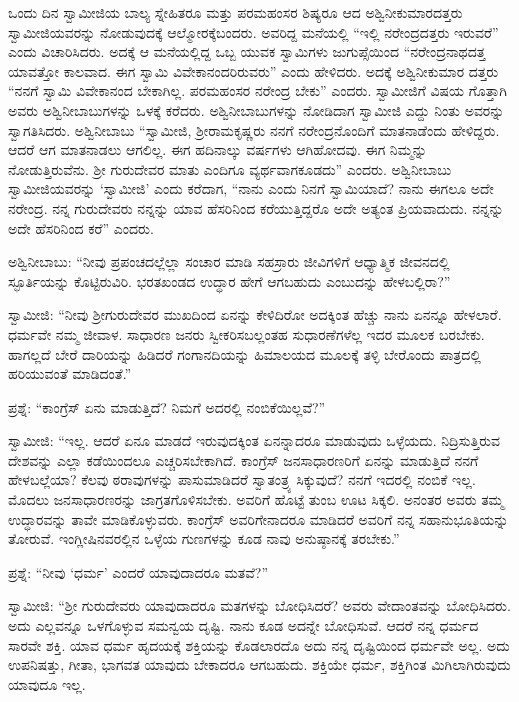  ಒಂದು ದಿನ ಸ್ವಾಮೀಜಿಯ ಬಾಲ್ಯ ಸ್ನೇಹಿತರೂ ಮತ್ತು ಪರಮಹಂಸರ ಶಿಷ್ಯರೂ ಆದ ಅಶ್ವಿನೀಕುಮಾರದತ್ತರು ಸ್ವಾಮೀಜಿಯವರನ್ನು ನೋಡುವುದಕ್ಕೆ ಆಲ್ಮೋರಕ್ಕೆ\break ಬಂದರು. ಅವರಿದ್ದ ಮನೆಯಲ್ಲಿ “ಇಲ್ಲಿ ನರೇಂದ್ರದತ್ತರು ಇರುವರೆ” ಎಂದು ವಿಚಾರಿಸಿದರು. ಅದಕ್ಕೆ ಆ ಮನೆಯಲ್ಲಿದ್ದ ಒಬ್ಬ ಯುವಕ ಸ್ವಾಮಿಗಳು ಜುಗುಪ್ಸೆಯಿಂದ “ನರೇಂದ್ರನಾಥದತ್ತ ಯಾವತ್ತೋ ಕಾಲವಾದ. ಈಗ ಸ್ವಾಮಿ ವಿವೇಕಾನಂದರಿರುವರು” ಎಂದು ಹೇಳಿದರು. ಅದಕ್ಕೆ ಅಶ್ವಿನೀಕುಮಾರ ದತ್ತರು “ನನಗೆ ಸ್ವಾಮಿ ವಿವೇಕಾನಂದ ಬೇಕಾಗಿಲ್ಲ. ಪರಮಹಂಸರ ನರೇಂದ್ರ ಬೇಕು” ಎಂದರು. ಸ್ವಾಮೀಜಿಗೆ ವಿಷಯ ಗೊತ್ತಾಗಿ ಅವರು ಅಶ್ವಿನೀಬಾಬುಗಳನ್ನು ಒಳಕ್ಕೆ ಕರೆದರು. ಅಶ್ವಿನೀಬಾಬುಗಳನ್ನು ನೋಡಿದಾಗ ಸ್ವಾಮೀಜಿ ಎದ್ದು ನಿಂತು ಅವರನ್ನು ಸ್ವಾಗತಿಸಿದರು. ಅಶ್ವಿನೀಬಾಬು “ಸ್ವಾಮೀಜಿ, ಶ‍್ರೀರಾಮಕೃಷ್ಣರು ನನಗೆ ನರೇಂದ್ರನೊಂದಿಗೆ ಮಾತನಾಡೆಂದು ಹೇಳಿದ್ದರು. ಆದರೆ ಆಗ ಮಾತನಾಡಲು ಆಗಲಿಲ್ಲ. ಈಗ ಹದಿನಾಲ್ಕು ವರ್ಷಗಳು ಆಗಿಹೋದವು. ಈಗ ನಿಮ್ಮನ್ನು ನೋಡುತ್ತಿರುವೆನು. ಶ‍್ರೀ ಗುರುದೇವರ ಮಾತು ಎಂದಿಗೂ ವ್ಯರ್ಥವಾಗಕೂಡದು” ಎಂದರು. ಅಶ್ವಿನೀಬಾಬು ಸ್ವಾಮೀಜಿಯವರನ್ನು ‘ಸ್ವಾಮೀಜಿ’ ಎಂದು ಕರೆದಾಗ, “ನಾನು ಎಂದು ನಿನಗೆ ಸ್ವಾಮಿಯಾದೆ? ನಾನು ಈಗಲೂ ಅದೇ ನರೇಂದ್ರ. ನನ್ನ ಗುರುದೇವರು ನನ್ನನ್ನು ಯಾವ ಹೆಸರಿನಿಂದ ಕರೆಯುತ್ತಿದ್ದರೊ ಅದೇ ಅತ್ಯಂತ ಪ್ರಿಯವಾದುದು. ನನ್ನನ್ನು ಅದೇ ಹೆಸರಿನಿಂದ ಕರೆ” ಎಂದರು. 

 ಅಶ್ವಿನೀಬಾಬು: “ನೀವು ಪ್ರಪಂಚದಲ್ಲೆಲ್ಲಾ ಸಂಚಾರ ಮಾಡಿ ಸಹಸ್ರಾರು ಜೀವಿಗಳಿಗೆ ಆಧ್ಯಾತ್ಮಿಕ ಜೀವನದಲ್ಲಿ ಸ್ಫೂರ್ತಿಯನ್ನು ಕೊಟ್ಟಿರುವಿರಿ. ಭರತಖಂಡದ ಉದ್ಧಾರ ಹೇಗೆ ಆಗಬಹುದು ಎಂಬುದನ್ನು ಹೇಳಬಲ್ಲಿರಾ?” 

 ಸ್ವಾಮೀಜಿ: “ನೀವು ಶ‍್ರೀಗುರುದೇವರ ಮುಖದಿಂದ ಏನನ್ನು ಕೇಳಿದಿರೋ ಅದಕ್ಕಿಂತ ಹೆಚ್ಚು ನಾನು ಏನನ್ನೂ ಹೇಳಲಾರೆ. ಧರ್ಮವೇ ನಮ್ಮ ಜೀವಾಳ. ಸಾಧಾರಣ ಜನರು ಸ್ವೀಕರಿಸಬಲ್ಲಂತಹ ಸುಧಾರಣೆಗಳೆಲ್ಲ ಇದರ ಮೂಲಕ ಬರಬೇಕು. ಹಾಗಲ್ಲದೆ ಬೇರೆ ದಾರಿಯನ್ನು ಹಿಡಿದರೆ ಗಂಗಾನದಿಯನ್ನು ಹಿಮಾಲಯದ ಮೂಲಕ್ಕೆ ತಳ್ಳಿ ಬೇರೊಂದು ಪಾತ್ರದಲ್ಲಿ ಹರಿಯುವಂತೆ ಮಾಡಿದಂತೆ.” 

 ಪ್ರಶ್ನೆ: “ಕಾಂಗ್ರೆಸ್ ಏನು ಮಾಡುತ್ತಿದೆ? ನಿಮಗೆ ಅದರಲ್ಲಿ ನಂಬಿಕೆಯಿಲ್ಲವೆ?” 

 ಸ್ವಾಮೀಜಿ: “ಇಲ್ಲ. ಆದರೆ ಏನೂ ಮಾಡದೆ ಇರುವುದಕ್ಕಿಂತ ಏನನ್ನಾದರೂ‌ ಮಾಡುವುದು ಒಳ್ಳೆಯದು. ನಿದ್ರಿಸುತ್ತಿರುವ ದೇಶವನ್ನು ಎಲ್ಲಾ ಕಡೆಯಿಂದಲೂ ಎಚ್ಚರಿಸಬೇಕಾಗಿದೆ. ಕಾಂಗ್ರೆಸ್ ಜನಸಾಧಾರಣರಿಗೆ ಏನನ್ನು ಮಾಡುತ್ತಿದೆ ನನಗೆ ಹೇಳಬಲ್ಲೆಯಾ? ಕೆಲವು ಠರಾವುಗಳನ್ನು ಪಾಸುಮಾಡಿದರೆ ಸ್ವಾತಂತ್ರ್ಯ ಸಿಕ್ಕುವುದೆ? ನನಗೆ ಇದರಲ್ಲಿ ನಂಬಿಕೆ ಇಲ್ಲ. ಮೊದಲು ಜನಸಾಧಾರಣರನ್ನು ಜಾಗ್ರತಗೊಳಿಸಬೇಕು. ಅವರಿಗೆ ಹೊಟ್ಟೆ ತುಂಬ ಊಟ ಸಿಕ್ಕಲಿ. ಅನಂತರ ಅವರು ತಮ್ಮ ಉದ್ಧಾರವನ್ನು ತಾವೇ ಮಾಡಿಕೊಳ್ಳುವರು. ಕಾಂಗ್ರೆಸ್ ಅವರಿಗೇನಾದರೂ ಮಾಡಿದರೆ ಅವರಿಗೆ ನನ್ನ ಸಹಾನುಭೂತಿಯನ್ನು ತೋರುವೆ. ಇಂಗ್ಲೀಷಿನವರಲ್ಲಿನ ಒಳ್ಳೆಯ ಗುಣಗಳನ್ನು ಕೂಡ ನಾವು ಅನುಷ್ಠಾನಕ್ಕೆ ತರಬೇಕು.” 

 ಪ್ರಶ್ನೆ: “ನೀವು ‘ಧರ್ಮ’ ಎಂದರೆ ಯಾವುದಾದರೂ ಮತವೆ?” 

 ಸ್ವಾಮೀಜಿ: “ಶ‍್ರೀ ಗುರುದೇವರು ಯಾವುದಾದರೂ ಮತಗಳನ್ನು ಬೋಧಿಸಿದರೆ? ಅವರು ವೇದಾಂತವನ್ನು ಬೋಧಿಸಿದರು. ಅದು ಎಲ್ಲವನ್ನೂ ಒಳಗೊಳ್ಳುವ ಸಮನ್ವಯ ದೃಷ್ಟಿ. ನಾನು ಕೂಡ ಅದನ್ನೇ ಬೋಧಿಸುವೆ. ಆದರೆ ನನ್ನ ಧರ್ಮದ ಸಾರವೇ ಶಕ್ತಿ. ಯಾವ ಧರ್ಮ ಹೃದಯಕ್ಕೆ ಶಕ್ತಿಯನ್ನು ಕೊಡಲಾರದೊ ಅದು ನನ್ನ ದೃಷ್ಟಿಯಿಂದ ಧರ್ಮವೇ ಅಲ್ಲ. ಅದು ಉಪನಿಷತ್ತು, ಗೀತಾ, ಭಾಗವತ ಯಾವುದು ಬೇಕಾದರೂ ಆಗಬಹುದು. ಶಕ್ತಿಯೇ ಧರ್ಮ, ಶಕ್ತಿಗಿಂತ ಮಿಗಿಲಾಗಿರುವುದು ಯಾವುದೂ ಇಲ್ಲ. 

